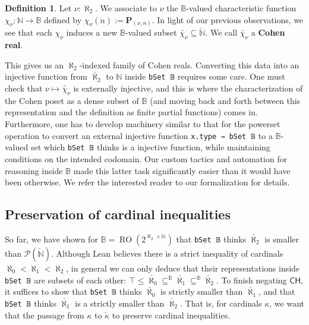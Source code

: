 \documentclass[a4paper,USenglish,cleveref, autoref]{lipics-v2019}
\newcommand{\B}{\mathbb{B}}
\newcommand{\lil}{\lstinline}
\newcommand{\N}{\mathbb{N}}
\theoremstyle{theorem}
\theoremstyle{definition}
\newtheorem{defn}[definition]{Definition}
\begin{document}
\begin{defn}
  Let $\nu : \aleph_2$. We associate to $\nu$ the $\B$-valued characteristic function $\chi_{\nu} : \N \to \B$ defined by $\chi_{\nu}(n) := \mathbf{P}_{(\nu, n)}$. In light of our previous observations, we see that each $\chi_{\nu}$ induces a new $\B$-valued subset $\widetilde{\chi_{\nu}} \subseteq \check{\N}$. We call $\widetilde{\chi_{\nu}}$ a \textbf{Cohen real}.
\end{defn}
This gives us an $\aleph_2$-indexed family of Cohen reals. Converting this data into an injective function from $\check{\aleph_2}$ to $\mathbb{N}$ inside \lil{bSet 𝔹} requires some care. One must check that $\nu \mapsto \widetilde{\chi_{\nu}}$ is externally injective, and this is where the characterization of the Cohen poset as a dense subset of $\B$ (and moving back and forth between this representation and the definition as finite partial functions) comes in. Furthermore, one has to develop machinery similar to that for the powerset operation to convert an external injective function \lstinline{x.type → bSet 𝔹} to a $\B$-valued set which \lstinline{bSet 𝔹} thinks is a injective function, while maintaining conditions on the intended codomain. Our custom tactics and automation for reasoning inside $\B$ made this latter task significantly easier than it would have been otherwise. We refer the interested reader to our formalization for details.

\subsection{Preservation of cardinal inequalities} \label{subsect:cardinal-inequalities}
So far, we have shown for $\B = \operatorname{RO}(2^{\aleph_2 \times \mathbb{N}})$ that \lil{bSet 𝔹} thinks $\check{\aleph_2}$ is smaller than $\mathcal{P}(\check{\mathbb{N}})$. Although Lean believes there is a strict inequality of cardinals $\aleph_0 < \aleph_1 < \aleph_2$, in general we can only deduce that their representations inside \lil{bSet 𝔹} are subsets of each other: $\top \leq \check{\aleph_0} \subseteq^\B \check{\aleph_1} \subseteq^\B \check{\aleph_2}$. To finish negating $\mathsf{CH}$, it suffices to show that \lstinline{bSet 𝔹} thinks $\check{\aleph_0}$ is strictly smaller than $\check{\aleph_1}$, and that \lstinline{bSet 𝔹} thinks $\check{\aleph_1}$ is a strictly smaller than $\check{\aleph_2}$. That is, for cardinals $\kappa$, we want that the passage from $\kappa$ to $\check{\kappa}$ to preserve cardinal inequalities.
\end{document}
